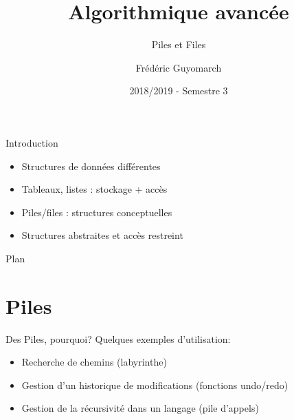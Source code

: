 \documentclass[12pt,a4paper]{beamer}
\title{\textbf{Algorithmique avancée}}
\subtitle{Piles et Files}
\author{Frédéric Guyomarch}
\date{2018/2019 - Semestre 3}
\institute %
{

  Université de Lille1\\
  IUT-A de Lille

}
\begin{document}
\begin{frame}
\titlepage
\end{frame}

\begin{frame}{Introduction}
\begin{itemize}
\item Structures de données différentes
\item Tableaux, listes : stockage + accès 
\item Piles/files : structures conceptuelles
\item Structures abstraites et accès restreint
\end{itemize}




\end{frame}

\begin{frame}{Plan}
\tableofcontents
\end{frame}

\section{Piles}

\begin{frame}{Des Piles, pourquoi?}
Quelques exemples d'utilisation:
\begin{itemize}
\item Recherche de chemins (labyrinthe) 
\item Gestion d'un historique de modifications (fonctions undo/redo)
\item Gestion de la récursivité dans un langage (pile d'appels)
\end{itemize}

\end{frame}
\end{document}
